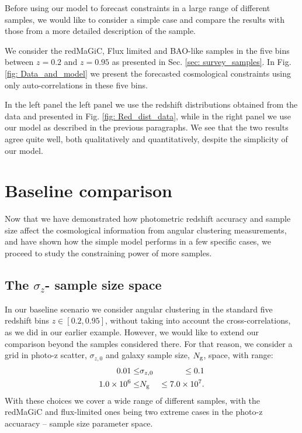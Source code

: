 \documentclass[a4paper,fleqn,usenatbib]{mnras}
\begin{document}
Before using our model to forecast constraints in a large range of different samples, we would like to consider a simple case and compare the results with those from a more detailed description of the sample. 

We consider the redMaGiC, Flux limited and BAO-like samples in the five bins between $z=0.2$ and $z=0.95$ as presented in Sec. \ref{sec: survey_samples}. In Fig. \ref{fig: Data_and_model} we present the forecasted cosmological constraints using only auto-correlations in these five bins.

In the left panel the left panel we use the redshift distributions obtained from the data and presented in Fig. \ref{fig: Red_dist_data}, while in the right panel we use our model as described in the previous paragraphs. We see that the two results agree quite  well, both qualitatively and quantitatively, despite the simplicity of our model.


\section{Baseline comparison}
\label{sec: Baseline}

Now that we have demonstrated how photometric redshift accuracy and sample size affect the cosmological information from angular clustering measurements, and have shown how the simple model performs in a few specific cases, we proceed to study the constraining power of more samples.

\subsection{The $\sigma_z$- sample size space}
\label{subsec: sig_sample_space}

In our baseline scenario we consider angular clustering in the standard five redshift bins $z \in [0.2, 0.95]$, without taking into account the cross-correlations, as we did in our earlier example. However, we would like to extend our comparison beyond the samples considered there. For that reason, we consider a grid in photo-z scatter, $\sigma_{z,0}$ and galaxy sample size, $N_{\mbox{\scriptsize{g}}}$, space, with range:
\begin{eqnarray}
0.01\leq &\sigma_{z,0} &\leq 0.1 \\
1.0 \times 10^6 \leq &N_{\mbox{\scriptsize{g}}} &\leq 7.0 \times 10^7.
\end{eqnarray}
With these choices we cover a wide range of different samples, with the redMaGiC and flux-limited ones being two extreme cases in the photo-z accuaracy  -- sample size parameter space.
\end{document}
